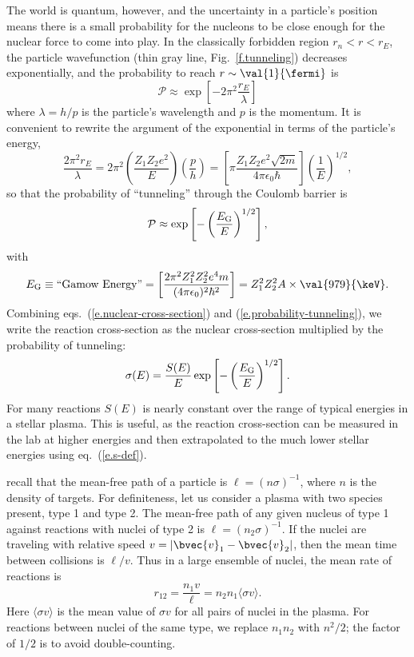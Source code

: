 The world is quantum, however, and the uncertainty in a particle's position means there is a small probability for the nucleons to be close enough for the nuclear force to come into play. In the classically forbidden region $r_{n} < r < r_{E}$, the particle wavefunction (thin gray line, Fig.~\ref{f.tunneling}) decreases exponentially, and the probability to reach $r\sim\val{1}{\fermi}$ is
\[ \mathcal{P}\approx \exp\left[-2\pi^{2}\frac{r_{E}}{\lambda}\right] \]
where $\lambda = h/p$ is the particle's wavelength and $p$ is the momentum.
It is convenient to rewrite the argument of the exponential in terms of the particle's energy,
\[ \frac{2\pi^{2}r_{E}}{\lambda} = 2\pi^{2}\left(\frac{Z_{1}Z_{2}e^{2}}{E}\right)
	\left(\frac{p}{h}\right) = \left[\pi \frac{Z_{1}Z_{2}e^{2}\sqrt{2m}}{4\pi\epsilon_{0}\hbar}\right]\left(\frac{1}{E}\right)^{1/2}, \]
so that the probability of ``tunneling'' through the Coulomb barrier is
\begin{equation}\label{e.probability-tunneling}
\mathcal{P} \approx \exp\left[-\left(\frac{E_{\mathrm{G}}}{E}\right)^{1/2}\right],
\end{equation}
with
\[ \EG \equiv \textrm{``Gamow Energy''} = \left[\frac{2\pi^{2}Z_{1}^{2}Z_{2}^{2}e^{4}m}{(4\pi\epsilon_{0})^{2}\hbar^{2}}\right] = Z_{1}^{2}Z_{2}^{2}A \times \val{979}{\keV}.
\]
Combining eqs.~(\ref{e.nuclear-cross-section}) and (\ref{e.probability-tunneling}), we write the reaction cross-section as the nuclear cross-section multiplied by the probability of tunneling:
\begin{equation}\label{e.s-def}
\sigma(E) = \frac{S(E)}{E}\exp\left[-\left(\frac{E_{\mathrm{G}}}{E}\right)^{1/2}\right].
\end{equation}
For many reactions $S(E)$ is nearly constant over the range of typical energies in a stellar plasma. This is useful, as the reaction cross-section can be measured in the lab at higher energies and then extrapolated to the much lower stellar energies using eq.~(\ref{e.s-def}).

 recall that the mean-free path of a particle is $\ell = (n\sigma)^{-1}$, where $n$ is the density of targets. For definiteness, let us consider a plasma with two species present, type 1 and type 2. The mean-free path of any given nucleus of type 1 against reactions with nuclei of type 2 is $\ell = (n_{2}\sigma)^{-1}$. If the nuclei are traveling with relative speed $v = |\bvec{v}_{1}-\bvec{v}_{2}|$, then the mean time between collisions is $\ell/v$. Thus in a large ensemble of nuclei, the mean rate of reactions is
\begin{equation}\label{e.mean-reaction-rate}
	r_{12} = \frac{n_{1} v}{\ell} = n_{2}n_{1}\langle\sigma v\rangle.
\end{equation}
Here $\langle \sigma v\rangle$ is the mean value of $\sigma v$ for all pairs of nuclei in the plasma. For reactions between nuclei of the same type, we replace $n_{1}n_{2}$ with $n^{2}/2$; the factor of $1/2$ is to avoid double-counting.

